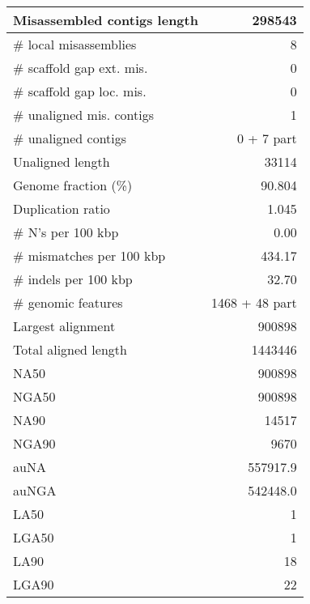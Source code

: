 \documentclass[12pt,a4paper]{article}
\begin{document}
\begin{table}[ht]
\begin{center}
\begin{tabular}{|l*{1}{|r}|}
Misassembled contigs length & 298543 \\ \hline
\# local misassemblies & 8 \\ \hline
\# scaffold gap ext. mis. & 0 \\ \hline
\# scaffold gap loc. mis. & 0 \\ \hline
\# unaligned mis. contigs & 1 \\ \hline
\# unaligned contigs & 0 + 7 part \\ \hline
Unaligned length & 33114 \\ \hline
Genome fraction (\%) & 90.804 \\ \hline
Duplication ratio & 1.045 \\ \hline
\# N's per 100 kbp & 0.00 \\ \hline
\# mismatches per 100 kbp & 434.17 \\ \hline
\# indels per 100 kbp & 32.70 \\ \hline
\# genomic features & 1468 + 48 part \\ \hline
Largest alignment & 900898 \\ \hline
Total aligned length & 1443446 \\ \hline
NA50 & 900898 \\ \hline
NGA50 & 900898 \\ \hline
NA90 & 14517 \\ \hline
NGA90 & 9670 \\ \hline
auNA & 557917.9 \\ \hline
auNGA & 542448.0 \\ \hline
LA50 & 1 \\ \hline
LGA50 & 1 \\ \hline
LA90 & 18 \\ \hline
LGA90 & 22 \\ \hline
\end{tabular}
\end{center}
\end{table}
\end{document}
